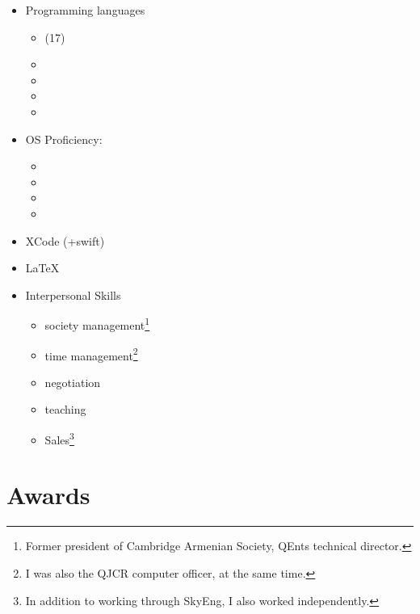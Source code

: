 \documentclass{CurriculumVitae}[10pt, draft, condensed]
\begin{document}
\begin{multicols}{4}
\begin{itemize}[topsep=0pt]
  \item {\footnotesize Programming languages}
    \begin{itemize}[topsep=0pt, partopsep=0pt]
      \setlength{\itemsep}{-0.3em}
    \item {} (17)
    \item {}
    \item {}
    \item {}
    \item {}
    \end{itemize}
  \item {\footnotesize OS Proficiency:}
    \begin{itemize}[topsep=0pt, partopsep=0pt]
      \setlength{\itemsep}{-0.3em}
    \item {}
    \item {}
    \item {}
    \item {}
    \end{itemize}
  \item {\footnotesize XCode (+swift)}
  \item {\footnotesize \LaTeX{}}
  \item {\footnotesize Interpersonal Skills}
    \begin{itemize}[topsep=0pt, partopsep=0pt]
      \setlength{\itemsep}{-0.3em}
    \item society management\footnote{Former president of Cambridge
        Armenian Society, QEnts technical director.}
    \item time management\footnote{I was also the QJCR computer
        officer, at the same time. }
    \item negotiation
    \item teaching
    \item Sales\footnote{In addition to working through SkyEng, I also
        worked independently. }
    \end{itemize}
  \end{itemize}
  
\end{multicols}

\section*{Awards}







\end{document}
